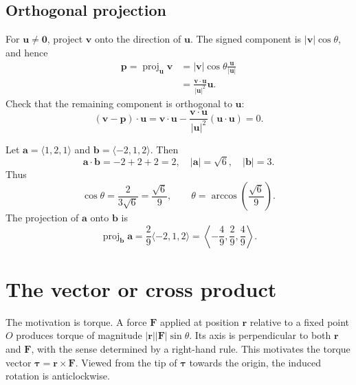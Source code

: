 \subsection{Orthogonal projection}
For $\mathbf u\ne\mathbf0$, project $\mathbf v$ onto the direction of
$\mathbf u$. The signed component is $|\mathbf v|\cos\theta$, and hence
\begin{align*}
 \mathbf p=\operatorname{proj}_{\mathbf u}\mathbf v
 &=|\mathbf v|\cos\theta\frac{\mathbf u}{|\mathbf u|}\\
 &=\boxed{\frac{\mathbf v\cdot\mathbf u}{|\mathbf u|^2}\mathbf u}.
\end{align*}
Check that the remaining component is orthogonal to $\mathbf u$:
\[
 (\mathbf v-\mathbf p)\cdot\mathbf u
 =\mathbf v\cdot\mathbf u
 -\frac{\mathbf v\cdot\mathbf u}{|\mathbf u|^2}(\mathbf u\cdot\mathbf u)=0.
\]
\begin{center}
\end{center}

\begin{example}
Let $\mathbf a=\langle1,2,1\rangle$ and
$\mathbf b=\langle-2,1,2\rangle$. Then
\[
 \mathbf a\cdot\mathbf b=-2+2+2=2,
 \quad |\mathbf a|=\sqrt6,\quad |\mathbf b|=3.
\]
Thus
\[
 \cos\theta=\frac{2}{3\sqrt6}=\frac{\sqrt6}{9},
 \qquad\theta=\arccos\left(\frac{\sqrt6}{9}\right).
\]
The projection of $\mathbf a$ onto $\mathbf b$ is
\[
 \operatorname{proj}_{\mathbf b}\mathbf a
 =\frac29\langle-2,1,2\rangle
 =\left\langle-\frac49,\frac29,\frac49\right\rangle.
\]
\end{example}

\section{The vector or cross product}

The motivation is torque. A force $\mathbf F$ applied at position $\mathbf r$
relative to a fixed point $O$ produces torque of magnitude
$|\mathbf r||\mathbf F|\sin\theta$. Its axis is perpendicular to both
$\mathbf r$ and $\mathbf F$, with the sense determined by a right-hand rule.
This motivates the torque vector $\boldsymbol\tau=\mathbf r\times\mathbf F$.
Viewed from the tip of $\boldsymbol\tau$ towards the origin, the induced
rotation is anticlockwise.

